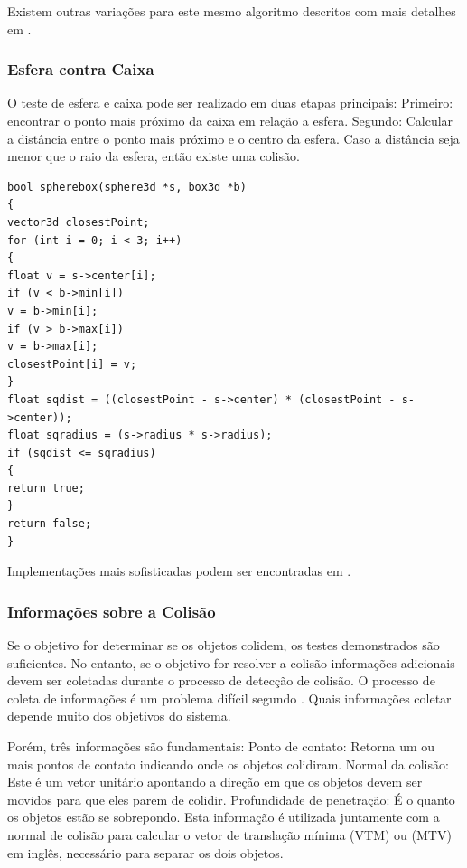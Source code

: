 Existem outras variações para este mesmo algoritmo descritos com mais detalhes
em .

\subsubsection{Esfera contra Caixa}

O teste de esfera e caixa pode ser realizado em duas etapas principais:
Primeiro: encontrar o ponto mais próximo da caixa em relação a esfera.
Segundo: Calcular a distância entre o ponto mais próximo e o centro da esfera.
Caso a distância seja menor que o raio da esfera, então existe uma colisão.

\begin{lstlisting}[frame=single,caption=Colisão entre esfera e caixa\label{code:collisionSphereBox}]
bool spherebox(sphere3d *s, box3d *b)
{
vector3d closestPoint;
for (int i = 0; i < 3; i++)
{
float v = s->center[i];
if (v < b->min[i])
v = b->min[i];
if (v > b->max[i])
v = b->max[i];
closestPoint[i] = v;
}
float sqdist = ((closestPoint - s->center) * (closestPoint - s->center));
float sqradius = (s->radius * s->radius);
if (sqdist <= sqradius)
{
return true;
}
return false;
}
\end{lstlisting}

Implementações mais sofisticadas podem ser encontradas em .

\subsubsection{Informações sobre a Colisão}

Se o objetivo for determinar  se os objetos colidem, os testes demonstrados são
suficientes. No entanto, se o objetivo for resolver a colisão informações adicionais devem
ser coletadas durante o processo de detecção de colisão. O processo de coleta
de informações é um problema difícil segundo .
Quais informações coletar depende muito dos objetivos do sistema.

Porém, três informações são fundamentais:
Ponto de contato: Retorna um ou mais pontos de contato indicando onde os objetos colidiram.
Normal da colisão: Este é um vetor unitário apontando a direção em que os objetos devem ser movidos para que eles parem de colidir.
Profundidade de penetração: É o quanto os objetos estão se sobrepondo. Esta
informação é utilizada juntamente com a normal de colisão para calcular o vetor
de translação mínima (VTM) ou (MTV) em inglês, necessário para separar os dois
objetos.

